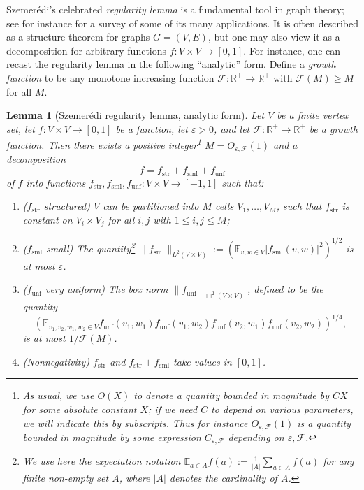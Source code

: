 \documentclass[11pt,reqno]{amsart}
\numberwithin{equation}{section}
\theoremstyle{plain}
\newtheorem{lemma}[subsection]{Lemma}
\theoremstyle{definition}
\renewcommand{\leq}{\leqslant}
\renewcommand{\geq}{\geqslant}
\newcommand\E{{\mathbb{E}}}
\newcommand\R{\mathbb{R}}
\newcommand\1{{\bf 1}}
\newcommand\2{{\bf 2}}
\newcommand\eps{\varepsilon}
\newcommand\str{{\operatorname{str}}}
\newcommand\sml{{\operatorname{sml}}}
\newcommand\unf{{\operatorname{unf}}}
\newcommand\Grow{{\mathcal F}}
\begin{document}
Szemer\'edi's celebrated \emph{regularity lemma} \cite{szemeredi-aps, szemeredi-reg} is a fundamental tool in graph theory; see for instance \cite{komlos} for a survey of some of its many applications.  It is often described as a structure theorem for graphs $G = (V,E)$, but one may also view it as a decomposition for arbitrary functions $f: V \times V \to [0,1]$. For instance, one can recast the regularity lemma in the following ``analytic'' form.  Define a \emph{growth function} to be any monotone increasing function $\Grow: \R^+ \to \R^+$ with $\Grow(M) \geq M$ for all $M$.

\begin{lemma}[Szemer\'edi regularity lemma, analytic form]\label{szrl}  Let $V$ be a finite vertex set, let $f: V \times V \to [0,1]$ be a function, let $\eps > 0$, and let $\Grow: \R^+ \to \R^+$ be a growth function.  Then there exists a positive integer\footnote{As usual, we use $O(X)$ to denote a quantity bounded in magnitude by $CX$ for some absolute constant $X$; if we need $C$ to depend on various parameters, we will indicate this by subscripts.  Thus for instance $O_{\eps,\Grow}(1)$ is a quantity bounded in magnitude by some expression $C_{\eps,\Grow}$ depending on $\eps,\Grow$.} $M = O_{\eps,\Grow}(1)$ and a decomposition
\begin{equation}\label{fss}
 f = f_\str + f_\sml + f_\unf
\end{equation}
of $f$ into functions $f_\str, f_\sml, f_\unf: V \times V \to [-1,1]$ such that:
\begin{enumerate}
\item \textup{(}$f_\str$ structured\textup{)} $V$ can be partitioned into $M$ cells $V_1,\ldots,V_M$, such that $f_\str$ is constant on $V_i \times V_j$ for all $i,j$ with $1 \leq i,j \leq M$;
\item \textup{(}$f_\sml$ small\textup{)} The quantity\footnote{We use here the expectation notation $\E_{a \in A} f(a) := \frac{1}{|A|} \sum_{a \in A} f(a)$ for any finite non-empty set $A$, where $|A|$ denotes the cardinality of $A$.} $\|f_\sml\|_{L^2(V \times V)} := (\E_{v,w \in V} |f_\sml(v,w)|^2)^{1/2}$ is at most $\eps$.
\item \textup{(}$f_\unf$ very uniform\textup{)}  The box norm  $\| f_\unf\|_{\Box^2(V \times V)} $, defined to be the quantity
$$ (\E_{v_1,v_2,w_1,w_2 \in V} f_\unf(v_1,w_1) f_\unf(v_1,w_2) f_\unf(v_2,w_1) f_\unf(v_2,w_2))^{1/4},$$
is at most $1/\Grow(M)$.
\item \textup{(}Nonnegativity\textup{)} $f_{\str}$ and $f_\str + f_\sml$ take values in $[0,1]$.
\end{enumerate}
\end{lemma}
\end{document}

